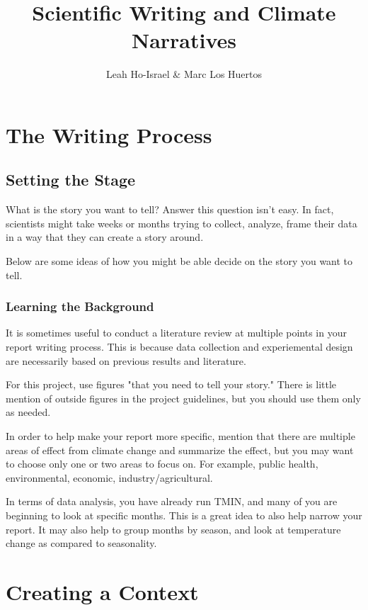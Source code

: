 \documentclass{article}\usepackage[]{graphicx}\usepackage[]{color}
\title{Scientific Writing and Climate Narratives}
\author{Leah Ho-Israel \& Marc Los Huertos}
\begin{document}
\maketitle

\section{The Writing Process}

\subsection{Setting the Stage}

What is the story you want to tell? Answer this question isn't easy. In fact, scientists might take weeks or months trying to collect, analyze, frame their data in a way that they can create a story around. 

Below are some ideas of how you might be able decide on the story you want to tell. 


\subsubsection{Learning the Background}

It is sometimes useful to conduct a literature review at multiple points in your report writing process. This is because data collection and experiemental design are necessarily based on previous results and literature.

For this project, use figures "that you need to tell your story." There is little mention of outside figures in the project guidelines, but you should use them only as needed. 

In order to help make your report more specific, mention that there are multiple areas of effect from climate change and summarize the effect, but you may want to choose only one or two areas to focus on. For example, public health, environmental, economic, industry/agricultural. 

In terms of data analysis, you have already run TMIN, and many of you are beginning to look at specific months. This is a great idea to also help narrow your report. It may also help to group months by season, and look at temperature change as compared to seasonality.

\section{Creating a Context}
\end{document}
